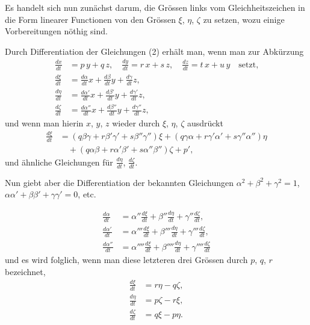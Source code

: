 \documentclass[12pt,a4paper]{book}
\theoremstyle{definition}
\theoremstyle{remark}
\begin{document}
Es handelt sich nun zun\"achst darum, die Gr\"ossen links vom Gleichheitszeichen in die Form linearer Functionen von den Gr\"ossen $\xi$, $\eta$, $\zeta$ zu setzen, wozu einige Vorbereitungen n\"othig sind.

Durch Differentiation der Gleichungen (2) erh\"alt man, wenn man zur Abk\"urzung
\begin{align*}
\frac{dx}{dt} &= p\,y + q\,z,\quad \frac{dy}{dt} = r\,x + s\,z,\quad \frac{dz}{dt} = t\,x + u\,y\quad\text{setzt,}\\
\frac{d\xi}{dt} &= \frac{d\alpha}{dt}x + \frac{d\beta}{dt}y + \frac{d\gamma}{dt}z,\\
\frac{d\eta}{dt} &= \frac{d\alpha'}{dt}x + \frac{d\beta'}{dt}y + \frac{d\gamma'}{dt}z,\\
\frac{d\zeta}{dt} &= \frac{d\alpha''}{dt}x + \frac{d\beta''}{dt}y + \frac{d\gamma''}{dt}z,\tag{2}
\end{align*}
und wenn man hierin $x$, $y$, $z$ wieder durch $\xi$, $\eta$, $\zeta$ ausdr\"uckt
\begin{align*}
\frac{d\xi}{dt} &= (q\beta\gamma + r\beta'\gamma' + s\beta''\gamma'')\xi + (q\gamma\alpha + r\gamma'\alpha' + s\gamma''\alpha'')\eta\\
&\quad + (q\alpha\beta + r\alpha'\beta' + s\alpha''\beta'')\zeta + p',\tag{3}
\end{align*}
und \"ahnliche Gleichungen f\"ur $\frac{d\eta}{dt}$, $\frac{d\zeta}{dt}$.

Nun giebt aber die Differentiation der bekannten Gleichungen $\alpha^{2} + \beta^{2} + \gamma^{2} = 1$, $\alpha\alpha' + \beta\beta' + \gamma\gamma' = 0$, etc.

\begin{align*}
\frac{d\alpha}{dt} &= \alpha''\frac{d\xi}{dt} + \beta''\frac{d\eta}{dt} + \gamma''\frac{d\zeta}{dt},\\
\frac{d\alpha'}{dt} &= \alpha'''\frac{d\xi}{dt} + \beta'''\frac{d\eta}{dt} + \gamma'''\frac{d\zeta}{dt},\\
\frac{d\alpha''}{dt} &= \alpha''''\frac{d\xi}{dt} + \beta''''\frac{d\eta}{dt} + \gamma''''\frac{d\zeta}{dt}\tag{3}
\end{align*}
und es wird folglich, wenn man diese letzteren drei Gr\"ossen durch $p$, $q$, $r$ bezeichnet,
\begin{align*}
\frac{d\xi}{dt} &= r\eta - q\zeta,\\
\frac{d\eta}{dt} &= p\zeta - r\xi,\\
\frac{d\zeta}{dt} &= q\xi - p\eta.\tag{4}
\end{align*}
\end{document}
